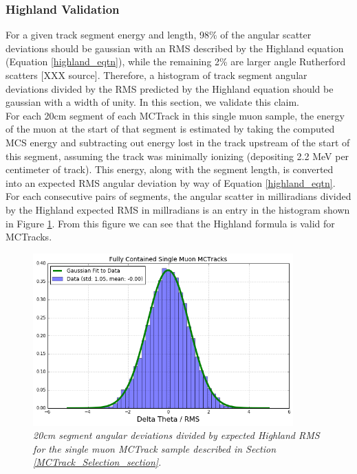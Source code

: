 \subsubsection{Highland Validation}\label{Highland_Validation_MCTrack_section}
For a given track segment energy and length, 98\% of the angular scatter deviations should be gaussian with an RMS described by the Highland equation (Equation \ref{highland_eqtn}), while the remaining 2\% are larger angle Rutherford scatters [XXX source]. Therefore, a histogram of track segment angular deviations divided by the RMS predicted by the Highland equation should be gaussian with a width of unity. In this section, we validate this claim.\\

For each 20cm segment of each {\sc MCTrack} in this single muon sample, the energy of the muon at the start of that segment is estimated by taking the computed MCS energy and subtracting out energy lost in the track upstream of the start of this segment, assuming the track was minimally ionizing (depositing 2.2 MeV per centimeter of track). This energy, along with the segment length, is converted into an expected RMS angular deviation by way of Equation \ref{highland_eqtn}. For each consecutive pairs of segments, the angular scatter in milliradians divided by the Highland expected RMS in millradians is an entry in the histogram shown in Figure \ref{Highland_validation_MCTracks_fig}. From this figure we can see that the Highland formula is valid for {\sc MCTracks}.

\begin{figure}[h!]
\begin{center}
\includegraphics[width=100mm]{Figures/Highland_validation_MCTracks.png}
\end{center}
\caption{\textit{20cm segment angular deviations divided by expected Highland RMS for the single muon {\sc MCTrack} sample described in Section \ref{MCTrack_Selection_section}.}}
\label{Highland_validation_MCTracks_fig}
\end{figure}









